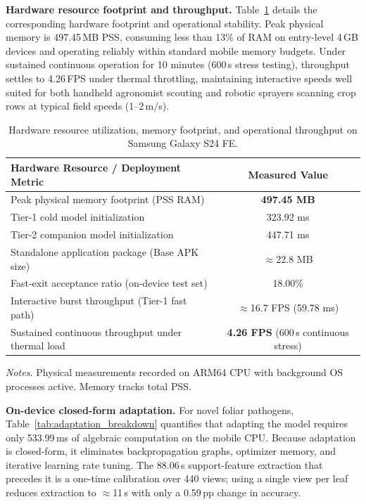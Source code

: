 \documentclass[preprint,12pt]{elsarticle}
\begin{document}
\textbf{Hardware resource footprint and throughput.} Table~\ref{tab:hardware_footprint} details the corresponding hardware footprint and operational stability. Peak physical memory is 497.45\,MB PSS, consuming less than 13\% of RAM on entry-level 4\,GB devices and operating reliably within standard mobile memory budgets. Under sustained continuous operation for 10 minutes (600\,s stress testing), throughput settles to 4.26\,FPS under thermal throttling, maintaining interactive speeds well suited for both handheld agronomist scouting and robotic sprayers scanning crop rows at typical field speeds (1--2\,m/s).

\begin{table}[htbp]
\caption{Hardware resource utilization, memory footprint, and operational throughput on Samsung Galaxy S24 FE.}
\label{tab:hardware_footprint}
\centering

\footnotesize
\setlength{\tabcolsep}{4pt}
\begin{tabular*}{\textwidth}{@{\extracolsep{\fill}}lc}
\toprule
\textbf{Hardware Resource / Deployment Metric} & \textbf{Measured Value} \\
\midrule
Peak physical memory footprint (PSS RAM) & \textbf{497.45 MB} \\
Tier-1 cold model initialization & 323.92 ms \\
Tier-2 companion model initialization & 447.71 ms \\
Standalone application package (Base APK size) & $\approx$22.8 MB \\
Fast-exit acceptance ratio (on-device test set) & 18.00\% \\
Interactive burst throughput (Tier-1 fast path) & $\approx$16.7 FPS (59.78 ms) \\
Sustained continuous throughput under thermal load & \textbf{4.26 FPS} (600\,s continuous stress) \\
\bottomrule
\end{tabular*}

\vspace{3pt}
\begin{minipage}{\textwidth}
\footnotesize
\textit{Notes.} Physical measurements recorded on ARM64 CPU with background OS processes active. Memory tracks total PSS.
\end{minipage}
\end{table}

\textbf{On-device closed-form adaptation.} For novel foliar pathogens, Table~\ref{tab:adaptation_breakdown} quantifies that adapting the model requires only 533.99\,ms of algebraic computation on the mobile CPU. Because adaptation is closed-form, it eliminates backpropagation graphs, optimizer memory, and iterative learning rate tuning. The 88.06\,s support-feature extraction that precedes it is a one-time calibration over 440 views; using a single view per leaf reduces extraction to $\approx$11\,s with only a 0.59\,pp change in accuracy.
\end{document}
